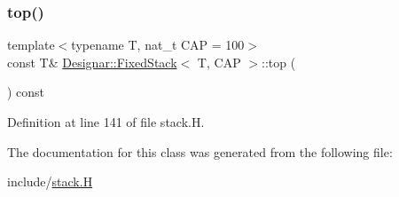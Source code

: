 \subsubsection{\texorpdfstring{top()}{top()}\hspace{0.1cm}{\footnotesize\ttfamily [2/2]}}
{\footnotesize\ttfamily template$<$typename T, nat\+\_\+t C\+AP = 100$>$ \\
const T\& \hyperlink{class_designar_1_1_fixed_stack}{Designar\+::\+Fixed\+Stack}$<$ T, C\+AP $>$\+::top (\begin{DoxyParamCaption}{ }\end{DoxyParamCaption}) const\hspace{0.3cm}{\ttfamily [inline]}}



Definition at line 141 of file stack.\+H.



The documentation for this class was generated from the following file\+:\begin{DoxyCompactItemize}
\item 
include/\hyperlink{stack_8_h}{stack.\+H}\end{DoxyCompactItemize}
